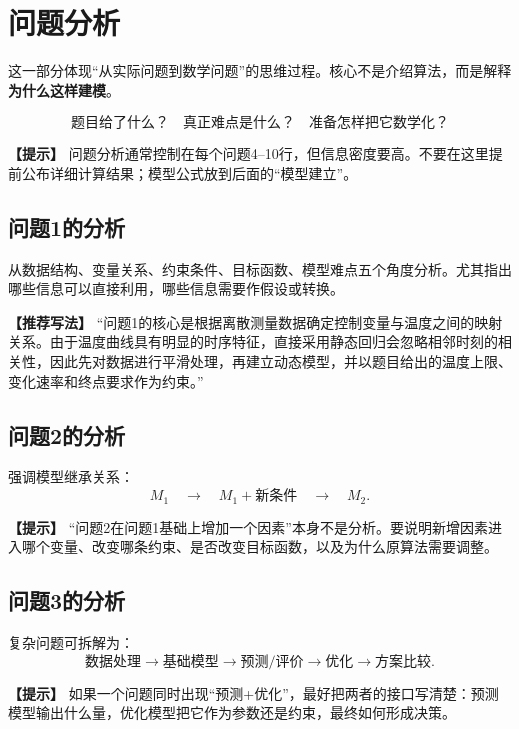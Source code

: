 \documentclass[12pt,a4paper]{article}
\newcommand{\tip}[1]{\par\noindent\textbf{【提示】} #1\par}
\newcommand{\good}[1]{\par\noindent\textbf{【推荐写法】} #1\par}
\begin{document}
\section{问题分析}

这一部分体现“从实际问题到数学问题”的思维过程。核心不是介绍算法，而是解释\textbf{为什么这样建模}。

\[
\boxed{\text{题目给了什么？}\quad\text{真正难点是什么？}\quad\text{准备怎样把它数学化？}}
\]

\tip{问题分析通常控制在每个问题4--10行，但信息密度要高。不要在这里提前公布详细计算结果；模型公式放到后面的“模型建立”。}

\subsection{问题1的分析}

从数据结构、变量关系、约束条件、目标函数、模型难点五个角度分析。尤其指出哪些信息可以直接利用，哪些信息需要作假设或转换。

\good{“问题1的核心是根据离散测量数据确定控制变量与温度之间的映射关系。由于温度曲线具有明显的时序特征，直接采用静态回归会忽略相邻时刻的相关性，因此先对数据进行平滑处理，再建立动态模型，并以题目给出的温度上限、变化速率和终点要求作为约束。”}

\subsection{问题2的分析}

强调模型继承关系：
\[
M_1\quad\longrightarrow\quad M_1+\text{新条件}\quad\longrightarrow\quad M_2.
\]

\tip{“问题2在问题1基础上增加一个因素”本身不是分析。要说明新增因素进入哪个变量、改变哪条约束、是否改变目标函数，以及为什么原算法需要调整。}

\subsection{问题3的分析}

复杂问题可拆解为：
\[
\text{数据处理}\rightarrow\text{基础模型}\rightarrow\text{预测/评价}\rightarrow\text{优化}\rightarrow\text{方案比较}. 
\]

\tip{如果一个问题同时出现“预测+优化”，最好把两者的接口写清楚：预测模型输出什么量，优化模型把它作为参数还是约束，最终如何形成决策。}

\end{document}
